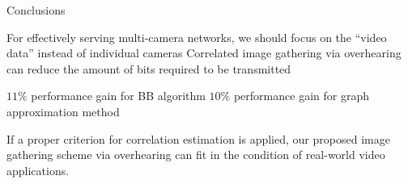 \begin{frame}{Conclusions}
\begin{itemize}
	\myItem For effectively serving multi-camera networks, we should focus on the ``video data'' instead of individual cameras
	\myItem Correlated image gathering via overhearing can reduce the amount of bits required to be transmitted
	\begin{itemize}
		\mySubItem $11 \%$ performance gain for BB algorithm
		\mySubItem $10 \%$ performance gain for graph approximation method
	\end{itemize}
	\myItem If a proper criterion for correlation estimation is applied, our proposed image gathering scheme via overhearing can fit in the condition of real-world video applications.
\end{itemize}
\end{frame}